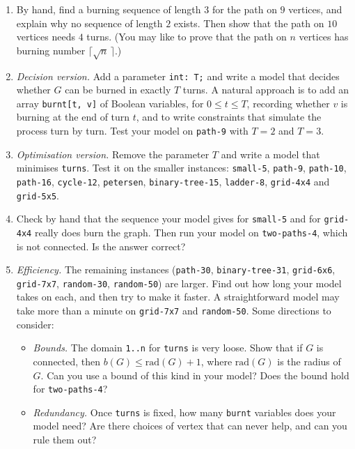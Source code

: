 \documentclass[11pt]{article}
\begin{document}
\begin{enumerate}
\item By hand, find a burning sequence of length $3$ for the path on $9$ vertices, and explain why no sequence of length $2$ exists. Then show that the path on $10$ vertices needs $4$ turns. (You may like to prove that the path on $n$ vertices has burning number $\lceil \sqrt{n}\, \rceil$.)
\item \emph{Decision version.} Add a parameter \mbox{\texttt{int: T;}} and write a model that decides whether $G$ can be burned in exactly $T$ turns. A natural approach is to add an array \mbox{\texttt{burnt[t, v]}} of Boolean variables, for $0 \le t \le T$, recording whether $v$ is burning at the end of turn $t$, and to write constraints that simulate the process turn by turn. Test your model on \mbox{\texttt{path-{}9}} with $T = 2$ and $T = 3$.
\item \emph{Optimisation version.} Remove the parameter $T$ and write a model that minimises \mbox{\texttt{turns}}. Test it on the smaller instances: \mbox{\texttt{small-{}5}}, \mbox{\texttt{path-{}9}}, \mbox{\texttt{path-{}10}}, \mbox{\texttt{path-{}16}}, \mbox{\texttt{cycle-{}12}}, \mbox{\texttt{petersen}}, \mbox{\texttt{binary-{}tree-{}15}}, \mbox{\texttt{ladder-{}8}}, \mbox{\texttt{grid-{}4x4}} and \mbox{\texttt{grid-{}5x5}}.
\item Check by hand that the sequence your model gives for \mbox{\texttt{small-{}5}} and for \mbox{\texttt{grid-{}4x4}} really does burn the graph. Then run your model on \mbox{\texttt{two-{}paths-{}4}}, which is not connected. Is the answer correct?
\item \emph{Efficiency.} The remaining instances (\mbox{\texttt{path-{}30}}, \mbox{\texttt{binary-{}tree-{}31}}, \mbox{\texttt{grid-{}6x6}}, \mbox{\texttt{grid-{}7x7}}, \mbox{\texttt{random-{}30}}, \mbox{\texttt{random-{}50}}) are larger. Find out how long your model takes on each, and then try to make it faster. A straightforward model may take more than a minute on \mbox{\texttt{grid-{}7x7}} and \mbox{\texttt{random-{}50}}. Some directions to consider:
\begin{itemize}
\item \emph{Bounds.} The domain \mbox{\texttt{1..n}} for \mbox{\texttt{turns}} is very loose. Show that if $G$ is connected, then $b(G) \le \mathrm{rad}(G) + 1$, where $\mathrm{rad}(G)$ is the radius of $G$. Can you use a bound of this kind in your model? Does the bound hold for \mbox{\texttt{two-{}paths-{}4}}?
\item \emph{Redundancy.} Once \mbox{\texttt{turns}} is fixed, how many \mbox{\texttt{burnt}} variables does your model need? Are there choices of vertex that can never help, and can you rule them out?

\end{itemize}
\end{enumerate}
\end{document}
